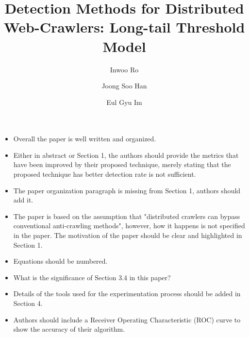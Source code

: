 \documentclass[sigconf,anonymous=true]{acmart}
\begin{document}
\title{Detection Methods for Distributed Web-Crawlers: Long-tail Threshold Model}

\author{Inwoo Ro}

\author{Joong Soo Han}

\author{Eul Gyu Im}


\begin{itemize}
\item Overall the paper is well written and organized.
\item Either in abstract or Section 1, the authors should provide the metrics that have been improved by their proposed technique, merely stating that the proposed technique has better detection rate is not sufficient.
\item The paper organization paragraph is missing from Section 1, authors should add it.

\item The paper is based on the assumption that "distributed crawlers can bypass conventional anti-crawling methods", however, how it happens is not specified in the paper. The motivation of the paper should be clear and highlighted in Section 1.
\item Equations should be numbered.
\item What is the significance of Section 3.4 in this paper?
\item Details of the tools used for the experimentation process should be added in Section 4.
\item Authors should include a Receiver Operating Characteristic (ROC) curve to show the accuracy of their algorithm.
\end{itemize}
\end{document}
